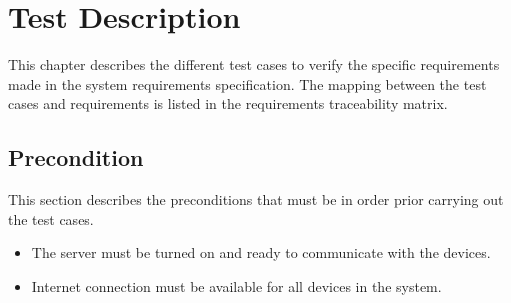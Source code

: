 \chapter{Test Description}
This chapter describes the different test cases to verify the specific requirements made in the system requirements specification. The mapping between the test cases and requirements is listed in the requirements traceability matrix.
\section{Precondition}
This section describes the preconditions that must be in order prior carrying out the test cases.

\begin{itemize}
\item The server must be turned on and ready to communicate with the devices.
\item Internet connection must be available for all devices in the system.
\end{itemize}












